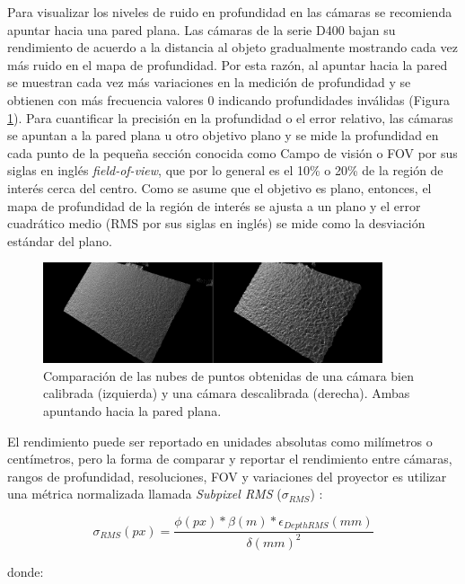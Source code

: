 Para visualizar los niveles de ruido en profundidad en las cámaras se recomienda apuntar hacia una pared plana. Las cámaras de la serie D400 bajan su rendimiento de acuerdo a la distancia al objeto gradualmente mostrando cada vez más ruido en el mapa de profundidad. Por esta razón, al apuntar hacia la pared se muestran cada vez más variaciones en la medición de profundidad y se obtienen con más frecuencia valores 0 indicando profundidades inválidas (Figura \ref{fig:calibration}). Para cuantificar la precisión en la profundidad o el error relativo, las cámaras se apuntan a la pared plana u otro objetivo plano y se mide la profundidad en cada punto de la pequeña sección conocida como Campo de visión o FOV por sus siglas en inglés \textit{field-of-view}, que por lo general es el 10\% o 20\% de la región de interés cerca del centro. Como se asume que el objetivo es plano, entonces, el mapa de profundidad de la región de interés se ajusta a un plano y el error cuadrático medio (RMS por sus siglas en inglés) se mide como la desviación estándar del plano.

\begin{figure}[ht]
	\centering
	\includegraphics[width=10cm]{./Graphics/calibration.png}
	\caption{Comparación de las nubes de puntos obtenidas de una cámara bien calibrada (izquierda) y una cámara descalibrada (derecha). Ambas apuntando hacia la pared plana.}
	\label{fig:calibration}
\end{figure}

El rendimiento puede ser reportado en unidades absolutas como milímetros o centímetros, pero la forma de comparar y reportar el rendimiento entre cámaras, rangos de profundidad, resoluciones, FOV y variaciones del proyector es utilizar una métrica normalizada llamada \textit{Subpixel RMS} ($\sigma_{RMS}$) \cite{grunnet2021intel}:

\begin{equation}
	\sigma_{RMS}(px) = \frac{\phi(px) * \beta(m) * \epsilon_{DepthRMS}(mm)}{\delta(mm)^2}
\end{equation}

donde:


